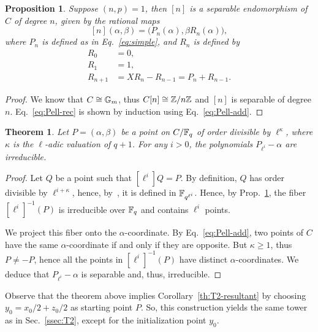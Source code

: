\documentclass{sig-alternate}
\newtheorem{theorem}[definition]{Theorem}
\newtheorem{proposition}[definition]{Proposition}
\begin{document}
\begin{proposition}
  \label{th:T2-divpol}
  Suppose $(n,p)=1$, then $[n]$ is a separable endomorphism of $C$ of
  degree $n$, given by the rational maps
  \begin{equation}
    \label{eq:Pell-rec}
    [n](\alpha,\beta) = \bigr(P_n(\alpha), \beta R_n(\alpha)\bigl),
  \end{equation}
  where $P_n$ is defined as in Eq.~\eqref{eq:simple}, and $R_n$ is
  defined by
  \begin{equation}
    \label{eq:fibonacci}
    \begin{aligned}
      R_0 &= 0,\\
      R_1 &= 1,\\
      R_{n+1} &= XR_{n} - R_{n-1} = P_n + R_{n-1}.
    \end{aligned}
  \end{equation}
\end{proposition}
\begin{proof}
  We know that $C\cong\mathbb{G}_m$, thus $C[n]\cong\mathbb{Z}/n\mathbb{Z}$ and $[n]$
  is separable of degree $n$. Eq.~\eqref{eq:Pell-rec} is shown by
  induction using Eq.~\eqref{eq:Pell-add}.
\end{proof}

\begin{theorem}
  \label{th:T2-irred}
  Let $P=(\alpha,\beta)$ be a point on $C/\mathbb{F}_q$ of order
  divisible by $\ell^\kappa$, where $\kappa$ is the $\ell$-adic
  valuation of $q+1$.  For any $i>0$, the polynomials
  $P_{\ell^i}-\alpha$ are irreducible.
\end{theorem}
\begin{proof}
  Let $Q$ be a point such that $[\ell^i]Q=P$. By definition, $Q$ has
  order divisible by $\ell^{i+\kappa}$, hence,
  by~\cite[Th.~VI.9.1]{lang}, it is defined in
  $\mathbb{F}_{q^{\ell^i}}$. Hence, by Prop.~\ref{th:T2-divpol}, the fiber
  $[\ell^i]^{-1}(P)$ is irreducible over $\mathbb{F}_q$ and contains $\ell^i$
  points.

  We project this fiber onto the $\alpha$-coordinate. By
  Eq.~\eqref{eq:Pell-add}, two points of $C$ have the same
  $\alpha$-coordinate if and only if they are opposite. But
  $\kappa\ge1$, thus $P\ne-P$, hence all the points in
  $[\ell^i]^{-1}(P)$ have distinct $\alpha$-coordinates. We deduce
  that $P_{\ell^i}-\alpha$ is separable and, thus, irreducible.
\end{proof}

Observe that the theorem above implies Corollary~\ref{th:T2-resultant}
by choosing $y_0 = x_0/2+z_0/2$ as starting point $P$. So, this
construction yields the same tower as in Sec.~\ref{ssec:T2}, except
for the initialization point $y_0$.
\end{document}
